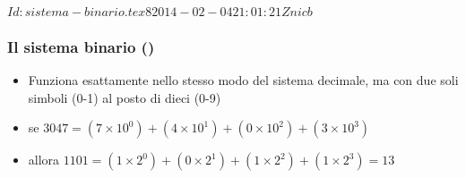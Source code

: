 %
%
%
%
%
\svnInfo $Id: sistema-binario.tex 8 2014-02-04 21:01:21Z nicb $

\setcounter{ms}{0}
\begin{frame}
    \frametitle{Il sistema binario ()}

	\begin{itemize}[<+- | alert@+->]
		\item Funziona esattamente nello stesso modo
			  del sistema decimale, ma con due soli simboli (0-1)
			  al posto di dieci (0-9)
		\item se $3047 = ( 7 \times 10^0 ) +
                      ( 4 \times 10^1 ) +
                      ( 0 \times 10^2 ) +
                      ( 3 \times 10^3 )$
		\item allora $1101 = ( 1 \times 2^0 ) +
                        ( 0 \times 2^1 ) +
                        ( 1 \times 2^2 ) +
                        ( 1 \times 2^3 ) = 13$
    \end{itemize}

\end{frame}

